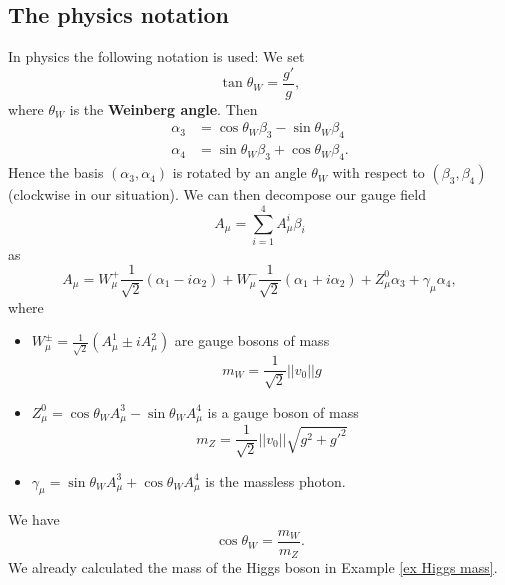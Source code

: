 \documentclass[11pt]{amsart}
\theoremstyle{definition}
\theoremstyle{remark}
\numberwithin{equation}{section}
\begin{document}
\subsection{The physics notation}
In physics the following notation is used: We set 
\begin{equation*}
\tan\theta_W=\frac{g'}{g},
\end{equation*}
where $\theta_W$ is the {\bf Weinberg angle}. Then 
\begin{align*}
\alpha_3&=\cos\theta_W\beta_3-\sin\theta_W\beta_4\\
\alpha_4&=\sin\theta_W\beta_3+\cos\theta_W\beta_4.
\end{align*}
Hence the basis $(\alpha_3,\alpha_4)$ is rotated by an angle $\theta_W$ with respect to $(\beta_3,\beta_4)$ (clockwise in our situation). We can then decompose our gauge field 
\begin{equation*}
A_\mu=\sum_{i=1}^4A_\mu^i\beta_i
\end{equation*}
as
\begin{equation*}
A_\mu=W^+_\mu\frac{1}{\sqrt{2}}(\alpha_1-i\alpha_2)+W^-_\mu\frac{1}{\sqrt{2}}(\alpha_1+i\alpha_2)+Z^0_\mu\alpha_3+\gamma_\mu\alpha_4,
\end{equation*}
where 
\begin{itemize}
\item $W^\pm_\mu=\frac{1}{\sqrt{2}}(A^1_\mu\pm iA^2_\mu)$ are gauge bosons of mass 
\begin{equation*}
m_W=\frac{1}{\sqrt{2}}||v_0||g
\end{equation*}
\item $Z^0_\mu=\cos\theta_WA^3_\mu-\sin\theta_WA^4_\mu$ is a gauge boson of mass 
\begin{equation*}
m_Z=\frac{1}{\sqrt{2}}||v_0||\sqrt{g^2+g'^2}
\end{equation*} 
\item $\gamma_\mu=\sin\theta_WA^3_\mu+\cos\theta_WA^4_\mu$ is the massless photon. 
\end{itemize}
We have 
\begin{equation*}
\cos\theta_W=\frac{m_W}{m_Z}.
\end{equation*}
We already calculated the mass of the Higgs boson in Example \ref{ex Higgs mass}.
\end{document}

